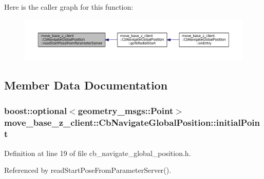 Here is the caller graph for this function\+:
\nopagebreak
\begin{figure}[H]
\begin{center}
\leavevmode
\includegraphics[width=350pt]{classmove__base__z__client_1_1CbNavigateGlobalPosition_a866ea02c9e25ac1df9df88272deb04b3_icgraph}
\end{center}
\end{figure}




\subsection{Member Data Documentation}
\subsubsection[{\texorpdfstring{initial\+Point}{initialPoint}}]{\setlength{\rightskip}{0pt plus 5cm}boost\+::optional$<$geometry\+\_\+msgs\+::\+Point$>$ move\+\_\+base\+\_\+z\+\_\+client\+::\+Cb\+Navigate\+Global\+Position\+::initial\+Point}\hypertarget{classmove__base__z__client_1_1CbNavigateGlobalPosition_a603d293ad4557e8332fcfd264d7075d4}{}\label{classmove__base__z__client_1_1CbNavigateGlobalPosition_a603d293ad4557e8332fcfd264d7075d4}


Definition at line 19 of file cb\+\_\+navigate\+\_\+global\+\_\+position.\+h.



Referenced by read\+Start\+Pose\+From\+Parameter\+Server().

